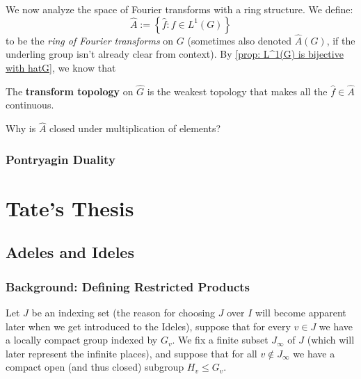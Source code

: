 \documentclass[11pt, x11names]{book}
\newcommand{\set}[1]{\left\{ #1 \right\}}
\renewcommand{\hat}{\widehat}
\begin{document}
We now analyze the space of Fourier transforms with a ring structure. We define:
\begin{equation*}
    \hat{A} := \set{\hat{f} : f \in L^1(G)}
\end{equation*}
to be the \textit{ring of Fourier transforms} on $G$ (sometimes also denoted $\hat{A}(G)$, if the underling group isn't already clear from context). By \ref{prop: L^1(G) is bijective with hatG}, we know that 
\begin{defn}
    The \textbf{transform topology} on $\hat{G}$ is the weakest topology that makes all the $\hat{f} \in \hat{A}$ continuous.
\end{defn}
\begin{sanitycheck}
    Why is $\hat{A}$ closed under multiplication of elements?
\end{sanitycheck}



\subsection{Pontryagin Duality}
\label{subsection: Pontryagin Duality}


\newpage



\newpage

\chapter{Tate's Thesis}

\newpage

\section{Adeles and Ideles}
\label{section: Adeles&Ideles}


\subsection{Background: Defining Restricted Products}
\label{subsection: Restricted Products Def}
Let $J$ be an indexing set (the reason for choosing $J$ over $I$ will become apparent
later when we get introduced to the Ideles), suppose that for every $v \in J$ we have 
a locally compact group indexed by $G_v$. We fix a finite subset $J_\infty$ of $J$ (which
will later represent the infinite places), and suppose that for all $v \notin J_\infty$
we have a compact open (and thus closed) subgroup $H_v \leq G_v$.
\end{document}
